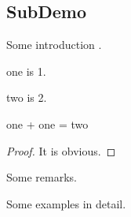 \subsection{SubDemo}
\label{sec:subdemo}

Some introduction \cite{themathlibcommunityLeanMathematicalLibrary2020} .

\begin{definition}[One]
\label{def:one}
\leanok

  one is 1.

\end{definition}

\begin{definition}[Two]
\label{def:two}
\leanok

    two is 2.

\end{definition}

\begin{lemma}
\label{lem:one_plus_one_is_two}
\leanok

one + one = two

\end{lemma}

\begin{proof}
\leanok
It is obvious.
\end{proof}

\begin{remark}
  \label{mk:remark_demo}
  
  Some remarks.

\end{remark}

\begin{example}
  \label{ex:example_demo}

  Some examples in detail.

\end{example}